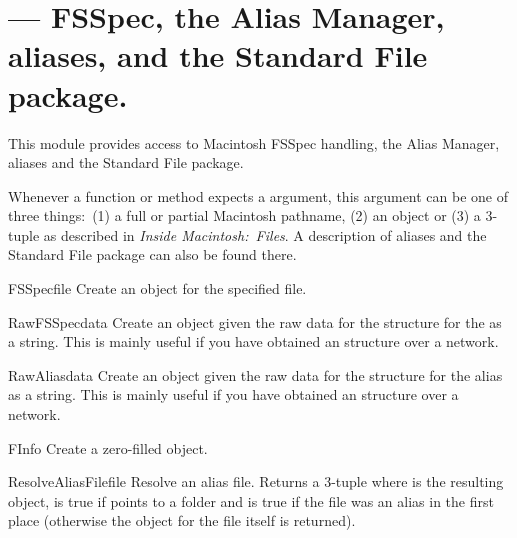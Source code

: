 \section{ ---
         FSSpec, the Alias Manager,  aliases,
         and the Standard File package.}




This module provides access to Macintosh FSSpec handling, the Alias
Manager,  aliases and the Standard File package.

Whenever a function or method expects a  argument, this
argument can be one of three things:\ (1) a full or partial Macintosh
pathname, (2) an  object or (3) a 3-tuple  as described in \emph{Inside
Macintosh:\ Files}. A description of aliases and the Standard File
package can also be found there.

\begin{funcdesc}{FSSpec}{file}
Create an  object for the specified file.
\end{funcdesc}

\begin{funcdesc}{RawFSSpec}{data}
Create an  object given the raw data for the \C{}
structure for the  as a string.  This is mainly useful
if you have obtained an  structure over a network.
\end{funcdesc}

\begin{funcdesc}{RawAlias}{data}
Create an  object given the raw data for the \C{}
structure for the alias as a string.  This is mainly useful if you
have obtained an  structure over a network.
\end{funcdesc}

\begin{funcdesc}{FInfo}{}
Create a zero-filled  object.
\end{funcdesc}

\begin{funcdesc}{ResolveAliasFile}{file}
Resolve an alias file. Returns a 3-tuple  where  is the resulting
 object,  is true if  points
to a folder and  is true if the file was an alias in the
first place (otherwise the  object for the file itself
is returned).
\end{funcdesc}

